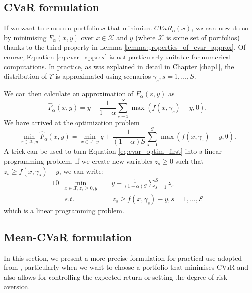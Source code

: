 \subsection{CVaR formulation}
If we want to choose a portfolio $x$ that minimises $CVaR_{\alpha}(x)$, we can now do so by minimising $F_{\alpha}(x,y)$ over $x \in \mathcal{X}$ and $y$ (where $\mathcal{X}$ is some set of portfolios) thanks to the third property in Lemma \ref{lemma:properties_of_cvar_approx}. Of course, Equation \ref{eq:cvar_approx} is not particularly suitable for numerical computations. In practice, as was explained in detail in Chapter \ref{chap1}, the distribution of $\Upsilon$ is approximated using scenarios $\gamma_s, s=1,\dots,S$. 

We can then calculate an approximation of $F_{\alpha}(x,y)$ as 
\begin{equation}
\label{eq:cvar_approx_approx}
\hat{F}_{\alpha}(x,y)=y + \frac{1}{1-\alpha} \sum_{s=1}^S  \max (f(x,\gamma_s)-y,0).
\end{equation}
We have arrived at the optimization problem 
\begin{equation}
\label{eq:cvar_optim_first}
\underset{x \in \mathcal{X}, y}{\min} \hat{F}_{\alpha}(x,y)= \underset{x \in \mathcal{X}, y}{\min} y + \frac{1}{(1-\alpha)S} \sum_{s=1}^S  \max (f(x,\gamma_s)-y,0).
\end{equation}
A trick can be used to turn Equation \ref{eq:cvar_optim_first} into a linear programming problem. If we create new variables $z_s \geq 0$ such that $z_s \geq f(x,\gamma_s)-y$, we can write:
\begin{alignat}{10}
& \underset{x \in \mathcal{X}, z_s \geq 0, y}{\min}  \, \, \, && y + \frac{1}{(1-\alpha)S} \sum_{s=1}^S z_s \\
&s.t. && \, z_s \geq f(x,\gamma_s)-y, s=1,\dots,S
\end{alignat}
which is a linear programming problem. 
\subsection{Mean-CVaR formulation}
In this section, we present a more precise formulation for practical use adopted from \cite{cvar_robust_mean_cvar_portfolio_optimization}, particularly when we want to choose a portfolio that minimises CVaR and also allows for controlling the expected return or setting the degree of risk aversion.
